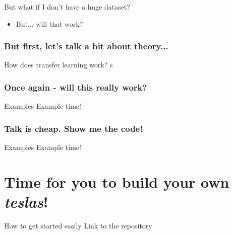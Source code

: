 \documentclass[aspectratio=1610,english]{beamer} %
\begin{document}
 	\begin{frame}{But what if I don't have a huge dataset?}
 		\begin{itemize}
		 	\item But... will that work? 
		 \end{itemize}
	\end{frame}

\section{But first, let's talk a bit about theory...}
  	\begin{frame}{How does transfer learning work?}
		s%
	 \end{frame}
 
 \section{Once again - will this really work?}
  	\begin{frame}{Examples}
		Example time!
	\end{frame}
  	
  	\section{Talk is cheap. Show me the code!}
	\begin{frame}{Examples}
	Example time!
	\end{frame}
	
	
\part{Time for you to build your own \textit{teslas}!}
	\begin{frame}{How to get started easily}
	Link to the repository
	\end{frame}
\end{document}
